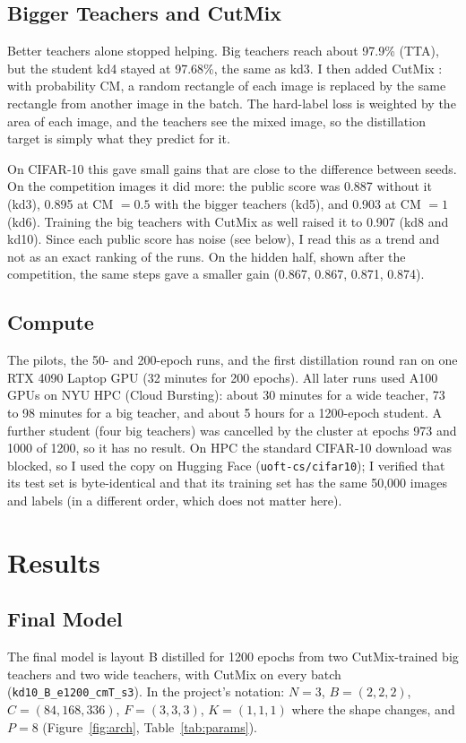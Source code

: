 \documentclass[letterpaper]{article}
\begin{document}
\subsection{Bigger Teachers and CutMix}
Better teachers alone stopped helping. Big teachers reach about 97.9\% (TTA), but the student kd4 stayed at 97.68\%,
the same as kd3. I then added CutMix \cite{yun2019cutmix}: with probability CM, a random rectangle of each image is
replaced by the same rectangle from another image in the batch. The hard-label loss is weighted by the area of each
image, and the teachers see the mixed image, so the distillation target is simply what they predict for it.

On CIFAR-10 this gave small gains that are close to the difference between seeds. On the competition images it did
more: the public score was 0.887 without it (kd3), 0.895 at CM $=0.5$ with the bigger teachers (kd5), and 0.903 at
CM $=1$ (kd6). Training the big teachers with CutMix as well raised it to 0.907 (kd8 and kd10). Since each public score
has noise (see below), I read this as a trend and not as an exact ranking of the runs. On the hidden half, shown after
the competition, the same steps gave a smaller gain (0.867, 0.867, 0.871, 0.874).

\subsection{Compute}
The pilots, the 50- and 200-epoch runs, and the first distillation round ran on one RTX 4090 Laptop GPU (32 minutes
for 200 epochs). All later runs used A100 GPUs on NYU HPC (Cloud Bursting): about 30 minutes for a wide teacher, 73 to
98 minutes for a big teacher, and about 5 hours for a 1200-epoch student. A further student (four big teachers) was
cancelled by the cluster at epochs 973 and 1000 of 1200, so it has no result. On HPC the standard CIFAR-10 download was
blocked, so I used the copy on Hugging Face (\texttt{uoft-cs/cifar10}); I verified that its test set is byte-identical
and that its training set has the same 50,000 images and labels (in a different order, which does not matter here).

\section{Results}

\subsection{Final Model}
The final model is layout B distilled for 1200 epochs from two CutMix-trained big teachers and two wide teachers, with
CutMix on every batch (\texttt{kd10\_B\_e1200\_cmT\_s3}). In the project's notation: $N=3$,
$B=(2,2,2)$, $C=(84,168,336)$, $F=(3,3,3)$, $K=(1,1,1)$ where the shape changes, and $P=8$ (Figure~\ref{fig:arch},
Table~\ref{tab:params}).
\end{document}
